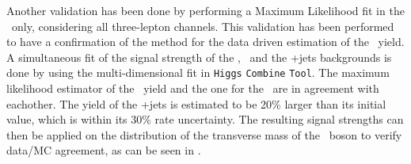 Another validation has been done by performing a Maximum Likelihood fit in the \WZCR\ only, considering all three-lepton channels. This validation has been performed to have a confirmation of the method for the data driven estimation of the \NPL\ yield. A simultaneous fit of the signal strength of the \NPE, \NPM\ and the \WZ+jets backgrounds is done by using the multi-dimensional fit in \texttt{Higgs} \texttt{Combine} \texttt{Tool}. The maximum likelihood estimator of the \NPM\ yield and the one for the \NPE\ are in agreement with eachother.  The yield of the \WZ+jets is estimated to be 20\% larger than its initial value, which is within its 30\% rate uncertainty. The resulting signal strengths can then be applied on the distribution of the transverse mass of the \PW\ boson to verify data/MC agreement, as can be seen in . %

